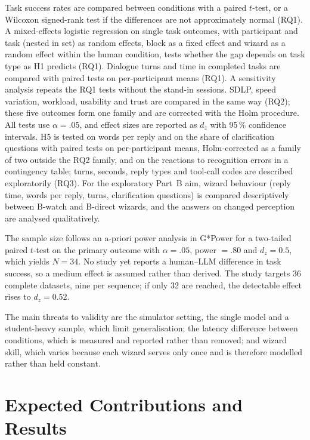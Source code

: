 \documentclass[
    a4paper,
    11pt,
    DIV=11,
    bigheadings,
    idxtotoc,
    listof=totoc,
    bibtotoc,
    halfparskip,
    cleardoubleempty,
    openright,
    oneside
]{scrartcl}
\begin{document}
Task success rates are compared between conditions with a paired $t$-test, or a Wilcoxon signed-rank test if the differences are not approximately normal (RQ1).
A mixed-effects logistic regression on single task outcomes, with participant and task (nested in set) as random effects, block as a fixed effect and wizard as a random effect within the human condition, tests whether the gap depends on task type as H1 predicts (RQ1).
Dialogue turns and time in completed tasks are compared with paired tests on per-participant means (RQ1).
A sensitivity analysis repeats the RQ1 tests without the stand-in sessions.
SDLP, speed variation, workload, usability and trust are compared in the same way (RQ2); these five outcomes form one family and are corrected with the Holm procedure.
All tests use $\alpha = .05$, and effect sizes are reported as $d_z$ with 95\,\% confidence intervals.
H5 is tested on words per reply and on the share of clarification questions with paired tests on per-participant means, Holm-corrected as a family of two outside the RQ2 family, and on the reactions to recognition errors in a contingency table; turns, seconds, reply types and tool-call codes are described exploratorily (RQ3).
For the exploratory Part~B aim, wizard behaviour (reply time, words per reply, turns, clarification questions) is compared descriptively between B-watch and B-direct wizards, and the answers on changed perception are analysed qualitatively.

The sample size follows an a-priori power analysis in G*Power for a two-tailed paired $t$-test on the primary outcome with $\alpha = .05$, power $= .80$ and $d_z = 0.5$, which yields $N = 34$.
No study yet reports a human--LLM difference in task success, so a medium effect is assumed rather than derived.
The study targets 36 complete datasets, nine per sequence; if only 32 are reached, the detectable effect rises to $d_z = 0.52$.

The main threats to validity are the simulator setting, the single model and a student-heavy sample, which limit generalisation; the latency difference between conditions, which is measured and reported rather than removed; and wizard skill, which varies because each wizard serves only once and is therefore modelled rather than held constant.

\section{Expected Contributions and Results}
\end{document}
